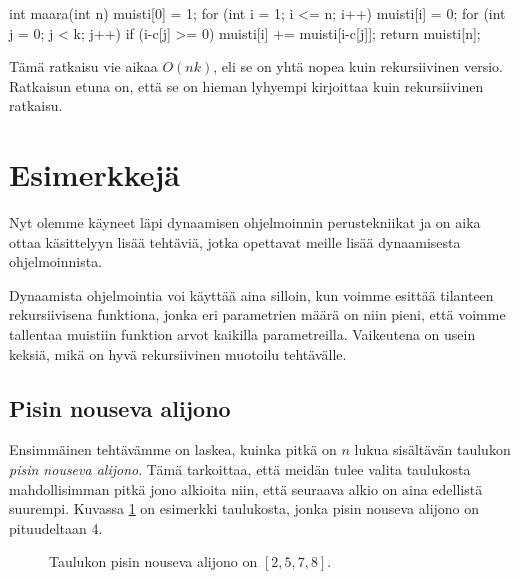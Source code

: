 \begin{code}
int maara(int n) {
    muisti[0] = 1;
    for (int i = 1; i <= n; i++) {
        muisti[i] = 0;
        for (int j = 0; j < k; j++) {
            if (i-c[j] >= 0) {
                muisti[i] += muisti[i-c[j]];
            }
        }
    }
    return muisti[n];
}
\end{code}

Tämä ratkaisu vie aikaa $O(nk)$, eli se on yhtä nopea kuin
rekursiivinen versio.
Ratkaisun etuna on, että se on hieman lyhyempi kirjoittaa
kuin rekursiivinen ratkaisu.

\section{Esimerkkejä}

Nyt olemme käyneet läpi dynaamisen ohjelmoinnin perustekniikat
ja on aika ottaa käsittelyyn lisää tehtäviä,
jotka opettavat meille lisää dynaamisesta ohjelmoinnista.

Dynaamista ohjelmointia voi käyttää aina silloin,
kun voimme esittää tilanteen rekursiivisena funktiona,
jonka eri parametrien määrä on niin pieni, että voimme
tallentaa muistiin funktion arvot kaikilla parametreilla.
Vaikeutena on usein keksiä, mikä on hyvä rekursiivinen
muotoilu tehtävälle.

\subsection{Pisin nouseva alijono}

Ensimmäinen tehtävämme on laskea, kuinka pitkä on
$n$ lukua sisältävän taulukon \emph{pisin nouseva alijono}.
Tämä tarkoittaa, että meidän tulee valita taulukosta
mahdollisimman pitkä jono alkioita niin,
että seuraava alkio on aina edellistä suurempi.
Kuvassa \ref{fig:pisnou} on esimerkki taulukosta,
jonka pisin nouseva alijono on pituudeltaan 4.

\begin{figure}
\center
{}
\caption{Taulukon pisin nouseva alijono on $[2,5,7,8]$.}
\label{fig:pisnou}
\end{figure}

